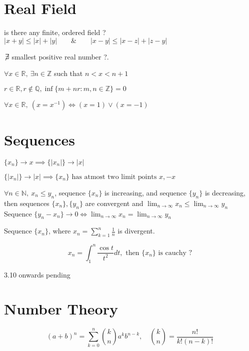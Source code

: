 \section{Real Field}
	\begin{remark}
		is there any finite, ordered field ?\\
		$|x+y| \le |x|+|y| \qquad \& \qquad |x-y| \le |x-z|+|z-y|$
	\end{remark}
	\begin{theorem}
		$\not\!\exists$ smallest positive real number ?.
	\end{theorem}
	\begin{theorem}
		$\forall x \in \mathbb{R},\ \exists n \in \mathbb{Z}$ such that $n < x < n+1$
	\end{theorem}
	\begin{remark}
		$r \in \mathbb{R}, r \not\in \mathbb{Q}, \inf\{ m+nr : m,n \in \mathbb{Z} \} = 0$
	\end{remark}
	\begin{remark}
		$\forall x \in \mathbb{R},\ (x=x^{-1}) \iff (x = 1) \vee (x = -1)$
	\end{remark}
\section{Sequences}
	\begin{theorem}
		$\{x_n\} \to x \implies \{|x_n|\} \to |x|$
	\end{theorem}
	\begin{remark}
		$\{|x_n|\} \to |x| \implies \{x_n\} \text{ has atmost two limit points } x, -x$
	\end{remark}
	\begin{remark}\cite{kham1}
		$\forall n \in \mathbb{N},\ x_n \le y_n$, sequence $\{x_n\}$ is increasing, and sequence $\{y_n\}$ is decreasing, then sequences $\{x_n\},\{y_n\}$ are convergent and $\lim_{n \to \infty} x_n \le \lim_{n \to \infty} y_n$\\
		Sequence $\{y_n-x_n\} \to 0 \iff \lim_{n \to \infty} x_n = \lim_{n \to \infty} y_n$
	\end{remark}
	\begin{remark}
		Sequence $\{x_n\}$, where $x_n = \sum_{k=1}^n \frac{1}{n}$ is divergent.
	\end{remark}
	\begin{remark}\cite{kham1}
		$$x_n = \int_1^n \frac{\cos t}{t^2}dt, \text{ then } \{x_n\} \text{ is cauchy ?}$$
	\end{remark}
	\cite{kham1} 3.10 onwards pending
\section{Number Theory}
	\begin{theorem}
		$$(a+b)^n = \sum_{k=0}^n \binom{k}{n} a^k b^{n-k},\quad \binom{k}{n} = \frac{n!}{k!(n-k)!}$$
	\end{theorem}
